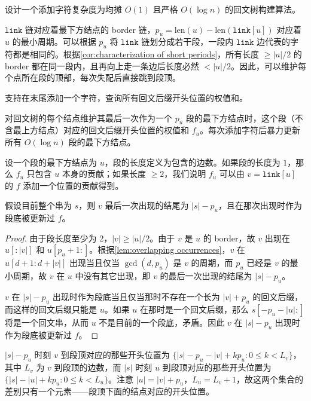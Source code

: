 \begin{exercise}
    设计一个添加字符复杂度为均摊 $O(1)$ 且严格 $O(\log n)$ 的回文树构建算法。
\end{exercise}
\begin{solution}
    $\mathtt{link}$ 链对应着最下方结点的 border 链，$p_u=\mathrm{len}(u)-\mathrm{len}(\mathtt{link}[u])$ 对应着 $u$ 的最小周期。可以根据 $p_u$ 将 $\mathtt{link}$ 链划分成若干段，一段内 $\mathtt{link}$ 边代表的字符都是相同的。根据\cref{cor:characterization of short periods}，所有长度 $\ge |u|/2$ 的 border 都在同一段内，且再向上走一条边后长度必然 $<|u|/2$。因此，可以维护每个点所在段的顶部，每次失配后直接跳到段顶。
\end{solution}

\begin{example}
    支持在末尾添加一个字符，查询所有回文后缀开头位置的权值和。
\end{example}
\begin{solution}
    对回文树的每个结点维护其最后一次作为一个 $p_u$ 段的最下方结点时，这个段（不含最上方结点）对应的回文后缀开头位置的权值和 $f_u$。每次添加字符后暴力更新所有 $O(\log n)$ 段的最下方结点。

    设一个段的最下方结点为 $u$，段的长度定义为包含的边数。如果段的长度为 $1$，那么 $f_u$ 只包含 $u$ 本身的贡献；如果长度 $\ge 2$，我们说明 $f_u$ 可以由 $v=\mathtt{link}[u]$ 的 $f$ 添加一个位置的贡献得到。
    \begin{claim}
        假设目前整个串为 $s$，则 $v$ 最后一次出现的结尾为 $|s|-p_u$，且在那次出现时作为段底被更新过 $f$。
    \end{claim}
    \begin{proof}
        由于段长度至少为 $2$，$|v|\ge |u|/2$。由于 $v$ 是 $u$ 的 border，故 $v$ 出现在 $u[:|v|]$ 和 $u[p_u+1:]$。根据\cref{lem:overlapping occurrences}，$v$ 在 $u[d+1:d+|v|]$ 出现当且仅当 $\gcd(d,p_u)$ 是 $v$ 的周期，而 $p_u$ 已经是 $v$ 的最小周期，故 $v$ 在 $u$ 中没有其它出现，即 $v$ 的最后一次出现的结尾为 $|s|-p_u$。
        
        $v$ 在 $|s|-p_u$ 出现时作为段底当且仅当那时不存在一个长为 $|v|+p_u$ 的回文后缀，而这样的回文后缀只能是 $u$。如果 $u$ 在那时是一个回文后缀，那么 $s[-p_u-|u|:]$ 将是一个回文串，从而 $u$ 不是目前的一个段底，矛盾。因此 $v$ 在 $|s|-p_u$ 出现时作为段底被更新过 $f$。  
    \end{proof}
    $|s|-p_u$ 时刻 $v$ 到段顶对应的那些开头位置为 $\{|s|-p_u-|v|+kp_u:0\le k< L_v\}$，其中 $L_v$ 为 $v$ 到段顶的边数，而 $|s|$ 时刻 $u$ 到段顶对应的那些开头位置为 $\{|s|-|u|+kp_u:0\le k<L_u\}$。注意 $|u|=|v|+p_u$，$L_u=L_v+1$，故这两个集合的差别只有一个元素——段顶下面的结点对应的开头位置。
\end{solution}

